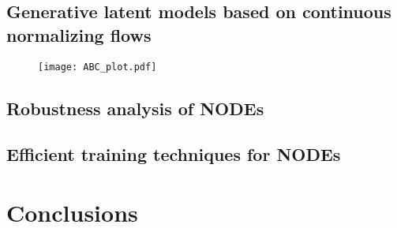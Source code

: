 \documentclass[fontsize=11pt]{article}
\theoremstyle{definition}
\begin{document}
\subsection{Generative latent models based on continuous normalizing flows}

\begin{figure}[h]
    \centering
    \texttt{[image: ABC\_plot.pdf]} 
\end{figure}

\subsection{Robustness analysis of NODEs}

\subsection{Efficient training techniques for NODEs}

\section{Conclusions}


\newpage
\FloatBarrier


\end{document}
